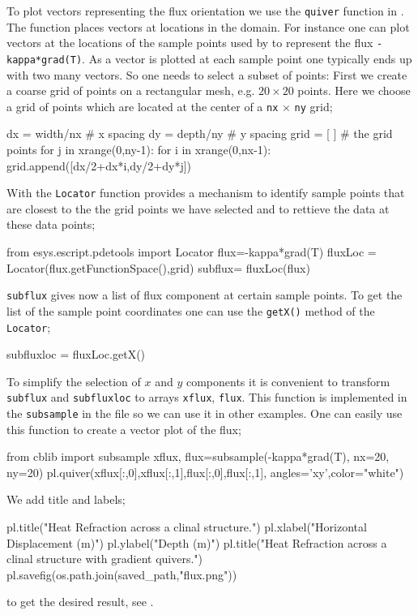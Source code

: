 To plot vectors representing the flux orientation we use the 
\verb|quiver| function in \pylab. The function places vectors at locations in
the domain.
For instance one can plot vectors at the locations of the sample points used by
\esc 
to represent the flux \verb|-kappa*grad(T)|. As a vector is plotted at each
sample point one typically ends
up with two many vectors. So one needs to select a subset of points:
First we create a coarse grid of points on a rectangular mesh, e.g. $20 \times
20$ points. Here we choose a grid of points which are located at the center of a
\verb|nx| $\times$ \verb|ny| grid;
\begin{python}
dx = width/nx # x spacing
dy = depth/ny # y spacing
grid = [ ] # the grid points
for j in xrange(0,ny-1):
    for i in xrange(0,nx-1):
           grid.append([dx/2+dx*i,dy/2+dy*j])
\end{python}
With the \verb|Locator|  function \esc provides a mechanism to identify sample
points that are closest 
to the the grid points we have selected and to rettieve the data at these data
points; 
\begin{python}
from esys.escript.pdetools import Locator
flux=-kappa*grad(T)
fluxLoc = Locator(flux.getFunctionSpace(),grid)
subflux= fluxLoc(flux) 
\end{python}
\verb|subflux| gives now a list of flux component at certain sample points. To
get the 
list of the sample point coordinates one can use the \verb|getX()| method of
the 
\verb|Locator|;
\begin{python}
subfluxloc = fluxLoc.getX()
\end{python}
To simplify the selection of $x$ and $y$ components it is convenient 
to transform \verb|subflux| and \verb|subfluxloc| to \numpy arrays
\verb|xflux|, \verb|flux|.
This function is implemented in the \verb|subsample| 
in the   file so we can use it in other examples. One can easily
use this function 
to create a vector plot of the flux;
\begin{python}
from cblib import subsample
xflux, flux=subsample(-kappa*grad(T), nx=20, ny=20)
pl.quiver(xflux[:,0],xflux[:,1],flux[:,0],flux[:,1], angles='xy',color="white")
\end{python}
We add title and labels;
\begin{python}
pl.title("Heat Refraction across a clinal structure.")
pl.xlabel("Horizontal Displacement (m)")
pl.ylabel("Depth (m)")
pl.title("Heat Refraction across a clinal structure \n with gradient quivers.")
pl.savefig(os.path.join(saved_path,"flux.png"))
\end{python} 
to get the desired result, see .

